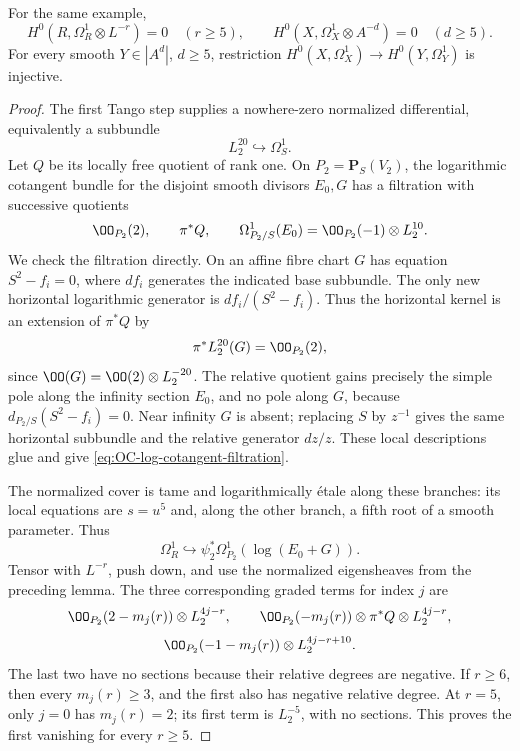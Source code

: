 \begin{lemma}
\label{lem:OC-threefold-differential-degrees}
For the same example,
\[
 H^0(R,\Omega_R^1\otimes L^{-r})=0\quad(r\geq5),
 \qquad
 H^0(X,\Omega_X^1\otimes A^{-d})=0\quad(d\geq5).
\]
For every smooth $Y\in|A^d|$, $d\geq5$, restriction
$H^0(X,\Omega_X^1)\to H^0(Y,\Omega_Y^1)$ is injective.
\end{lemma}
\begin{proof}
The first Tango step supplies a nowhere-zero normalized differential, equivalently a subbundle
\[
                L_2^{20}\hookrightarrow\Omega_S^1.
\]
Let $Q$ be its locally free quotient of rank one.  On
$P_2=\mathbf P_S(V_2)$, the logarithmic cotangent bundle for the disjoint smooth divisors $E_0,G$ has a filtration with successive quotients
\begin{equation}\label{eq:OC-log-cotangent-filtration}
 \OO_{P_2}(2),\qquad \pi^*Q,\qquad
 \Omega^1_{P_2/S}(E_0)=\OO_{P_2}(-1)\otimes L_2^{10}.
\end{equation}
We check the filtration directly.  On an affine fibre chart $G$ has equation $S^2-f_i=0$, where $df_i$ generates the indicated base subbundle.  The only new horizontal logarithmic generator is $df_i/(S^2-f_i)$.  Thus the horizontal kernel is an extension of $\pi^*Q$ by
\[
 \pi^*L_2^{20}(G)=\OO_{P_2}(2),
\]
since $\OO(G)=\OO(2)\otimes L_2^{-20}$.  The relative quotient gains precisely the simple pole along the infinity section $E_0$, and no pole along $G$, because $d_{P_2/S}(S^2-f_i)=0$.  Near infinity $G$ is absent; replacing $S$ by $z^{-1}$ gives the same horizontal subbundle and the relative generator $dz/z$.  These local descriptions glue and give \eqref{eq:OC-log-cotangent-filtration}.

The normalized cover is tame and logarithmically \'etale along these branches: its local equations are $s=u^5$ and, along the other branch, a fifth root of a smooth parameter.  Thus
\[
           \Omega_R^1\hookrightarrow
           \psi_2^*\Omega_{P_2}^1(\log(E_0+G)).
\]
Tensor with $L^{-r}$, push down, and use the normalized eigensheaves from the preceding lemma.  The three corresponding graded terms for index $j$ are
\[
 \OO_{P_2}(2-m_j(r))\otimes L_2^{4j-r},\qquad
 \OO_{P_2}(-m_j(r))\otimes\pi^*Q\otimes L_2^{4j-r},
\]
\[
 \OO_{P_2}(-1-m_j(r))\otimes L_2^{4j-r+10}.
\]
The last two have no sections because their relative degrees are negative.  If $r\geq6$, then every $m_j(r)\geq3$, and the first also has negative relative degree.  At $r=5$, only $j=0$ has $m_j(r)=2$; its first term is $L_2^{-5}$, with no sections.  This proves the first vanishing for every $r\geq5$.


\end{proof}
